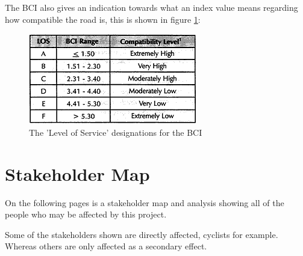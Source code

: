 \documentclass[a4paper]{report}
\begin{document}
The BCI also gives an indication towards what an index value means regarding how compatible the road is, this is shown in figure \ref{fig:bci_los}:

\begin{figure}
\centering
\includegraphics[scale=0.7]{figures/research_report/bci_los}
\caption{The 'Level of Service' designations for the BCI}
\label{fig:bci_los}
\end{figure}

\chapter{Stakeholder Map}
\label{ch:stakeholders}
On the following pages is a stakeholder map and analysis showing all of the people who may be affected by this project. 

Some of the stakeholders shown are directly affected, cyclists for example. Whereas others are only affected as a secondary effect.
\end{document}
